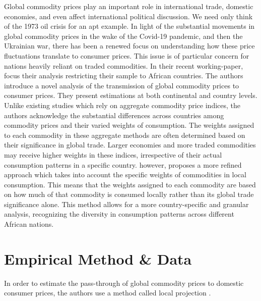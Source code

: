\documentclass[11pt]{article}
\newcommand{\bb}{\bigbreak\noindent}
\begin{document}
	\pagebreak
	\setcounter{page}{1}
	\begin{spacing}{2}
		\bb
		Global commodity prices play an important role in international trade, domestic economies, and even affect international political discussion. We need only think of the 1973 oil crisis for an apt example. In light of the substantial movements in global commodity prices in the wake of the Covid-19 pandemic, and then the Ukrainian war, there has been a renewed focus on understanding how these price fluctuations translate to consumer prices. This issue is of particular concern for nations heavily reliant on traded commodities.
		In their recent working-paper, \cite{lemaire2023international} focus their analysis restricting their sample to African countries. The authors introduce a novel analysis of the transmission of global commodity prices to consumer prices. They present estimations at both continental and country levels. Unlike existing studies which rely on aggregate commodity price indices, the authors acknowledge the substantial differences across countries among commodity prices and their varied weights of consumption. The weights assigned to each commodity in these aggregate methods are often determined based on their significance in global trade. Larger economies and more traded commodities may receive higher weights in these indices, irrespective of their actual consumption patterns in a specific country. \cite{lemaire2023international} however, proposes a more refined approach which takes into account the specific weights of commodities in local consumption. This means that the weights assigned to each commodity are based on how much of that commodity is consumed locally rather than its global trade significance alone. This method allows for a more country-specific and granular analysis, recognizing the diversity in consumption patterns across different African nations. 
		\section{Empirical Method \& Data }
		In order to estimate the pass-through of global commodity prices to domestic consumer prices, the authors use a method called local projection \parencite{jorda2005estimation}.
		

\end{spacing}
\end{document}
